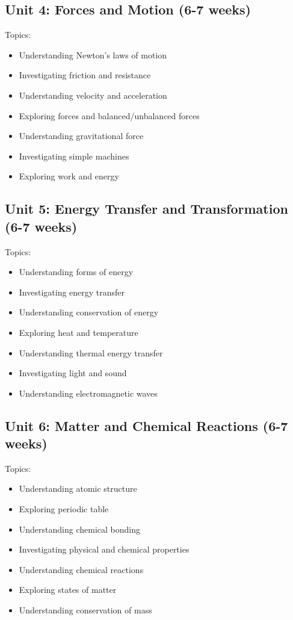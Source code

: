\documentclass[11pt,letterpaper]{report}
\begin{document}
\subsection{Unit 4: Forces and Motion (6-7 weeks)}

Topics:
\begin{itemize}
\item Understanding Newton's laws of motion
\item Investigating friction and resistance
\item Understanding velocity and acceleration
\item Exploring forces and balanced/unbalanced forces
\item Understanding gravitational force
\item Investigating simple machines
\item Exploring work and energy
\end{itemize}

\subsection{Unit 5: Energy Transfer and Transformation (6-7 weeks)}

Topics:
\begin{itemize}
\item Understanding forms of energy
\item Investigating energy transfer
\item Understanding conservation of energy
\item Exploring heat and temperature
\item Understanding thermal energy transfer
\item Investigating light and sound
\item Understanding electromagnetic waves
\end{itemize}

\subsection{Unit 6: Matter and Chemical Reactions (6-7 weeks)}

Topics:
\begin{itemize}
\item Understanding atomic structure
\item Exploring periodic table
\item Understanding chemical bonding
\item Investigating physical and chemical properties
\item Understanding chemical reactions
\item Exploring states of matter
\item Understanding conservation of mass
\end{itemize}
\end{document}

